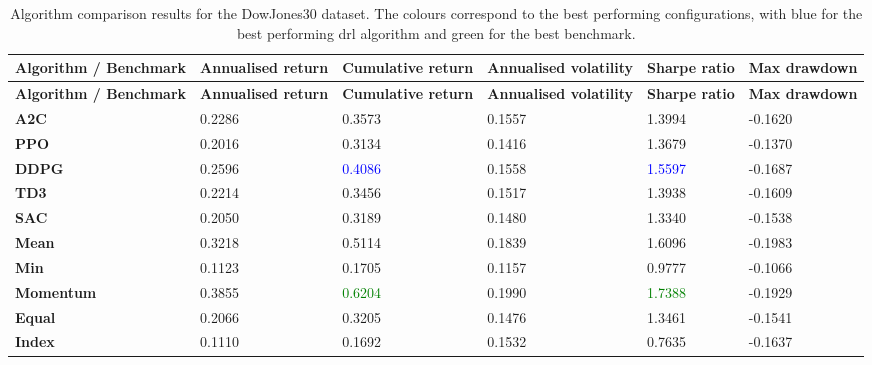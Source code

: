 \begin{longtable}{|p{2cm}|p{2.1cm}|p{2.1cm}|p{2.1cm}|p{1.5cm}|p{2cm}|}
    \caption{Algorithm comparison results for the DowJones30 dataset. The colours correspond to the best performing configurations, with blue for the best performing \acrshort{drl} algorithm and green for the best benchmark.}
    \label{tab:experiment_algorithms_dow30} 
    \\ 
    \hline
    \textbf{Algorithm / Benchmark} & \textbf{Annualised return} & \textbf{Cumulative return} & \textbf{Annualised volatility} & \textbf{Sharpe ratio} & \textbf{Max drawdown}  \\ \midrule
    \endfirsthead

    \hline
    \textbf{Algorithm / Benchmark} & \textbf{Annualised return} & \textbf{Cumulative return} & \textbf{Annualised volatility} & \textbf{Sharpe ratio} & \textbf{Max drawdown}  \\ \midrule
    \endhead

    \endfoot
    \hline

    \textbf{A2C} & 0.2286 & 0.3573 & 0.1557 & 1.3994 & -0.1620 \\ \hline
    \textbf{PPO} & 0.2016 & 0.3134 & 0.1416 & 1.3679 & -0.1370 \\ \hline
    \textbf{DDPG} & 0.2596 & \textcolor{blue}{0.4086} & 0.1558 & \textcolor{blue}{1.5597} & -0.1687 \\ \hline
    \textbf{TD3} & 0.2214 & 0.3456 & 0.1517 & 1.3938 & -0.1609 \\ \hline
    \textbf{SAC} & 0.2050 & 0.3189 & 0.1480 & 1.3340 & -0.1538 \\ \midrule
    \textbf{Mean} & 0.3218 & 0.5114 & 0.1839 & 1.6096 & -0.1983 \\ \hline
    \textbf{Min} & 0.1123 & 0.1705 & 0.1157 & 0.9777 & -0.1066 \\ \hline
    \textbf{Momentum} & 0.3855 & \textcolor{green}{0.6204} & 0.1990 & \textcolor{green}{1.7388} & -0.1929 \\ \hline
    \textbf{Equal} & 0.2066 & 0.3205 & 0.1476 & 1.3461 & -0.1541 \\ \hline
    \textbf{Index} & 0.1110 & 0.1692 & 0.1532 & 0.7635 & -0.1637 \\ \hline
\end{longtable}